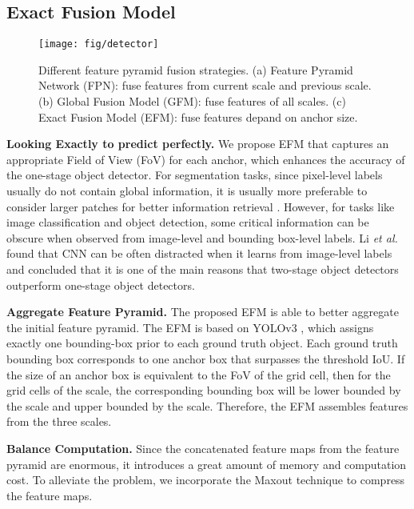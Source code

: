 \documentclass{article}
\begin{document}
\subsection{Exact Fusion Model}

\begin{figure*}[t]
	\begin{center}
		\texttt{[image: fig/detector]}
	\end{center}
	\caption{Different feature pyramid fusion strategies.  (a) Feature Pyramid Network (FPN): fuse features from current scale and previous scale.  (b) Global Fusion Model (GFM): fuse features of all scales.  (c) Exact Fusion Model (EFM): fuse features depand on anchor size.   }
	\label{fig:detector}
\end{figure*}



{\bf Looking Exactly to predict perfectly.} We propose EFM that captures an appropriate Field of View (FoV) for each anchor, which enhances the accuracy of the one-stage object detector.  For segmentation tasks, since pixel-level labels usually do not contain global information, it is usually more preferable to consider larger patches for better information retrieval \cite{liu2015parsenet}. However, for tasks like image classification and object detection, some critical information can be obscure when observed from image-level and bounding box-level labels. Li \textit{et al.} \cite{li2018tell} found that CNN can be often distracted when it learns from image-level labels and concluded that it is one of the main reasons that two-stage object detectors outperform one-stage object detectors.

{\bf Aggregate Feature Pyramid.} The proposed EFM is able to better aggregate the initial feature pyramid. The EFM is based on YOLOv3 \cite{redmon2018yolov3}, which assigns exactly one bounding-box prior to each ground truth object. Each ground truth bounding box corresponds to one anchor box that surpasses the threshold IoU. If the size of an anchor box is equivalent to the FoV of the grid cell, then for the grid cells of the  scale, the corresponding bounding box will be lower bounded by the  scale and upper bounded by the  scale. Therefore, the EFM assembles features from the three scales.

{\bf Balance Computation.} Since the concatenated feature maps from the feature pyramid are enormous, it introduces a great amount of memory and computation cost. To alleviate the problem, we incorporate the Maxout technique to compress the feature maps.
\end{document}
